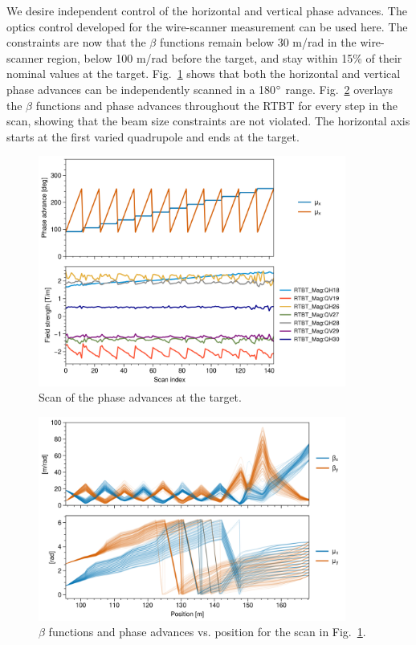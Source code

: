 We desire independent control of the horizontal and vertical phase advances. The optics control developed for the wire-scanner measurement can be used here. The constraints are now that the $\beta$ functions remain below 30 m/rad in the wire-scanner region, below 100 m/rad before the target, and stay within 15\% of their nominal values at the target. Fig.~\ref{fig:target_phase_scan_1} shows that both the horizontal and vertical phase advances can be independently scanned in a 180$\degree$ range. Fig.~\ref{fig:target_phase_scan_2} overlays the $\beta$ functions and phase advances throughout the RTBT for every step in the scan, showing that the beam size constraints are not violated. The horizontal axis starts at the first varied quadrupole and ends at the target.
%
\begin{figure}[!p]
    \centering
    \vspace*{2.0cm}
    \includegraphics[width=0.9\textwidth]{Images/chapter4/target_phase_scan1.png}
    \caption{Scan of the phase advances at the target.}
     \label{fig:target_phase_scan_1}
    \vspace*{2.0cm}
\end{figure}
%
\begin{figure}[!p]
    \centering
    \includegraphics[width=0.9\textwidth]{Images/chapter4/target_phase_scan2.png}
    \caption{$\beta$ functions and phase advances vs. position for the scan in Fig.~\ref{fig:target_phase_scan_1}.}
    \label{fig:target_phase_scan_2}
\end{figure}
